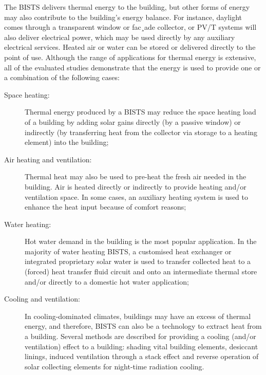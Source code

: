 The BISTS delivers thermal energy to the building, but other forms of energy may also contribute to the building's energy balance. For instance, daylight comes through a transparent window or fac¸ade collector, or PV/T systems will also deliver electrical power, which may be used directly by any auxiliary electrical services. Heated air or water can be stored or delivered directly to the point of use. Although the range of applications for thermal energy is extensive, all of the evaluated studies demonstrate that the energy is used to provide one or a combination of the following cases:

\begin{description}
	\item[Space heating:] Thermal energy produced by a BISTS may reduce the space heating load of a building by adding solar gains directly (by a passive window) or indirectly (by transferring heat from the collector via storage to a heating element) into the building;
	
	\item[Air heating and ventilation:] Thermal heat may also be used to pre-heat the fresh air needed in the building. Air is heated directly or indirectly to provide heating and/or ventilation space. In some cases, an auxiliary heating system is used to enhance the heat input because of comfort reasons;
	
	\item[Water heating:] Hot water demand in the building is the most popular application. In the majority of water heating BISTS, a customised heat exchanger or integrated proprietary solar water is used to transfer collected heat to a (forced) heat transfer fluid circuit and onto an intermediate thermal store and/or directly to a domestic hot water application; 
	
	\item[Cooling and ventilation:] In cooling-dominated climates, buildings may have an excess of thermal energy, and therefore, BISTS can also be a technology to extract heat from a building. Several methods are described for providing a cooling (and/or ventilation) effect to a building: shading vital building elements, desiccant linings, induced ventilation through a stack effect and reverse operation of solar collecting elements for night-time radiation cooling.
\end{description}

